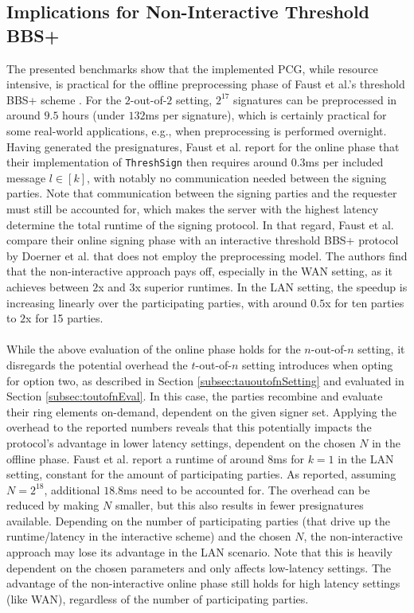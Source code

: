 \subsection{Implications for Non-Interactive Threshold BBS+}
\label{subsec:implNIBBs+}
The presented benchmarks show that the implemented PCG, while resource intensive, is practical for the offline preprocessing phase of Faust et al.'s threshold BBS+ scheme \cite{faust2023non}. For the $2$-out-of-$2$ setting, $2^{17}$ signatures can be preprocessed in around $9.5$ hours (under $132$ms per signature), which is certainly practical for some real-world applications, e.g., when preprocessing is performed overnight. Having generated the presignatures, Faust et al. report for the online phase that their implementation of \texttt{ThreshSign} then requires around $0.3$ms per included message $l\in[k]$, with notably no communication needed between the signing parties. Note that communication between the signing parties and the requester must still be accounted for, which makes the server with the highest latency determine the total runtime of the signing protocol. In that regard, Faust et al. compare their online signing phase with an interactive threshold BBS+ protocol by Doerner et al. \cite{doerner2023threshold} that does not employ the preprocessing model. The authors find that the non-interactive approach pays off, especially in the WAN setting, as it achieves between $2$x and $3$x superior runtimes. In the LAN setting, the speedup is increasing linearly over the participating parties, with around $0.5$x for ten parties to $2$x for 15 parties.
\\\\
While the above evaluation of the online phase holds for the $n$-out-of-$n$ setting, it disregards the potential overhead the $t$-out-of-$n$ setting introduces when opting for option two, as described in Section \ref{subsec:tauoutofnSetting} and evaluated in Section \ref{subsec:toutofnEval}. In this case, the parties recombine and evaluate their ring elements on-demand, dependent on the given signer set. Applying the overhead to the reported numbers reveals that this potentially impacts the protocol's advantage in lower latency settings, dependent on the chosen $N$ in the offline phase. Faust et al. report a runtime of around $8$ms for $k=1$ in the LAN setting, constant for the amount of participating parties. As reported, assuming $N=2^{18}$, additional $18.8$ms need to be accounted for. The overhead can be reduced by making $N$ smaller, but this also results in fewer presignatures available. Depending on the number of participating parties (that drive up the runtime/latency in the interactive scheme) and the chosen $N$, the non-interactive approach may lose its advantage in the LAN scenario. Note that this is heavily dependent on the chosen parameters and only affects low-latency settings. The advantage of the non-interactive online phase still holds for high latency settings (like WAN), regardless of the number of participating parties. 
